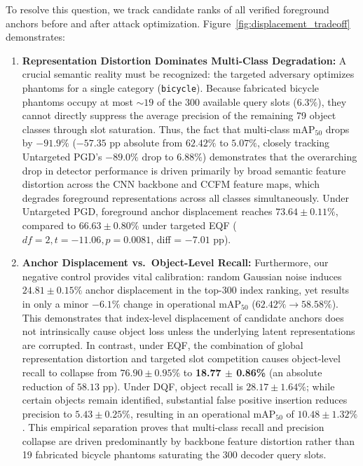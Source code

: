 \documentclass[preprint,12pt]{elsarticle}
\begin{document}
To resolve this question, we track candidate ranks of all verified foreground anchors before and after attack optimization. Figure~\ref{fig:displacement_tradeoff} demonstrates:
\begin{enumerate}
    \item \textbf{Representation Distortion Dominates Multi-Class Degradation:} A crucial semantic reality must be recognized: the targeted adversary optimizes phantoms for a single category (\texttt{bicycle}). Because fabricated bicycle phantoms occupy at most $\sim 19$ of the 300 available query slots ($6.3\%$), they cannot directly suppress the average precision of the remaining 79 object classes through slot saturation. Thus, the fact that multi-class $\mathrm{mAP}_{50}$ drops by $-91.9\%$ ($-57.35\text{ pp}$ absolute from $62.42\%$ to $5.07\%$, closely tracking Untargeted PGD's $-89.0\%$ drop to $6.88\%$) demonstrates that the overarching drop in detector performance is driven primarily by broad semantic feature distortion across the CNN backbone and CCFM feature maps, which degrades foreground representations across all classes simultaneously. Under Untargeted PGD, foreground anchor displacement reaches \textbf{$73.64 \pm 0.11\%$}, compared to \textbf{$66.63 \pm 0.80\%$} under targeted EQF ($df=2, t = -11.06, p = 0.0081$, diff = $-7.01\text{ pp}$).
    \item \textbf{Anchor Displacement vs.\ Object-Level Recall:} Furthermore, our negative control provides vital calibration: random Gaussian noise induces $24.81 \pm 0.15\%$ anchor displacement in the top-300 index ranking, yet results in only a minor $-6.1\%$ change in operational $\mathrm{mAP}_{50}$ ($62.42\% \to 58.58\%$). This demonstrates that index-level displacement of candidate anchors does not intrinsically cause object loss unless the underlying latent representations are corrupted. In contrast, under EQF, the combination of global representation distortion and targeted slot competition causes object-level recall to collapse from $76.90 \pm 0.95\%$ to \textbf{18.77 $\pm$ 0.86\%} (an absolute reduction of $58.13\text{ pp}$). Under DQF, object recall is $28.17 \pm 1.64\%$; while certain objects remain identified, substantial false positive insertion reduces precision to $5.43 \pm 0.25\%$, resulting in an operational $\mathrm{mAP}_{50}$ of $10.48 \pm 1.32\%$. This empirical separation proves that multi-class recall and precision collapse are driven predominantly by backbone feature distortion rather than 19 fabricated bicycle phantoms saturating the 300 decoder query slots.
\end{enumerate}
\end{document}
